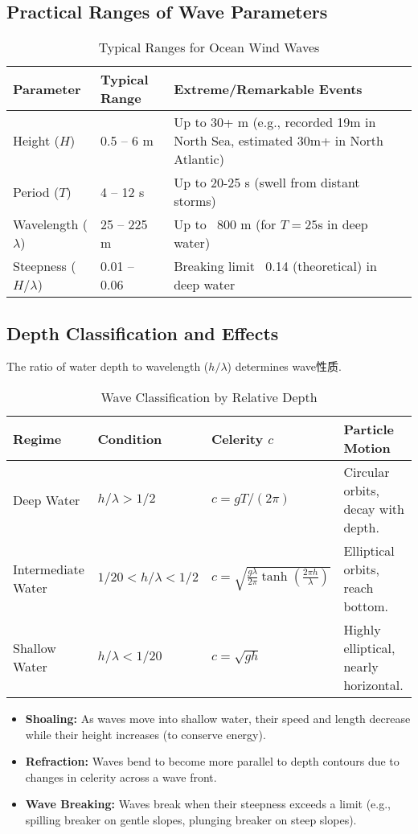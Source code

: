 \documentclass[11pt,letterpaper]{article}
\begin{document}
\subsection{Practical Ranges of Wave Parameters}
\begin{table}[H]
\centering
\caption{Typical Ranges for Ocean Wind Waves}
\begin{tabular}{@{}lL{4cm}L{4cm}@{}}
\toprule
Parameter & Typical Range & Extreme/Remarkable Events \\
\midrule
Height ($H$) & 0.5 – 6 m & Up to 30+ m (e.g., recorded 19m in North Sea, estimated 30m+ in North Atlantic) \\
Period ($T$) & 4 – 12 s & Up to 20-25 s (swell from distant storms) \\
Wavelength ($\lambda$) & 25 – 225 m & Up to ~800 m (for $T=25$s in deep water) \\
Steepness ($H/\lambda$) & 0.01 – 0.06 & Breaking limit ~0.14 (theoretical) in deep water \\
\bottomrule
\end{tabular}
\end{table}

\subsection{Depth Classification and Effects}
The ratio of water depth to wavelength ($h/\lambda$) determines wave性质.
\begin{table}[H]
\centering
\caption{Wave Classification by Relative Depth}
\begin{tabular}{@{}llll@{}}
\toprule
Regime & Condition & Celerity $c$ & Particle Motion \\
\midrule
Deep Water & $h / \lambda > 1/2$ & $c = gT/(2\pi)$ & Circular orbits, decay with depth. \\
Intermediate Water & $1/20 < h/\lambda < 1/2$ & $c = \sqrt{\frac{g\lambda}{2\pi} \tanh(\frac{2\pi h}{\lambda})}$ & Elliptical orbits, reach bottom. \\
Shallow Water & $h / \lambda < 1/20$ & $c = \sqrt{gh}$ & Highly elliptical, nearly horizontal. \\
\bottomrule
\end{tabular}
\end{table}
\begin{itemize}
    \item \textbf{Shoaling:} As waves move into shallow water, their speed and length decrease while their height increases (to conserve energy).
    \item \textbf{Refraction:} Waves bend to become more parallel to depth contours due to changes in celerity across a wave front.
    \item \textbf{Wave Breaking:} Waves break when their steepness exceeds a limit (e.g., spilling breaker on gentle slopes, plunging breaker on steep slopes).
\end{itemize}
\end{document}
